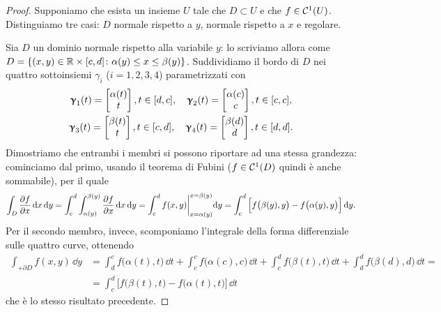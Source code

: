 \begin{proof}
	Supponiamo che esista un insieme $U$ tale che $D\subset U$ e che $f\in\mathcal{C}^{{1}}(U)$.
	Distinguiamo tre casi: $D$ normale rispetto a $y$, normale rispetto a $x$ e regolare.

	Sia $D$ un dominio normale rispetto alla variabile $y$: lo scriviamo allora come $D=\{(x,y)\in\mathbb{R}\times[c,d]\colon \alpha(y)\leq x\leq\beta(y)\}$.
	Suddividiamo il bordo di $D$ nei quattro sottoinsiemi $\gamma_i$ ($i=1,2,3,4$) parametrizzati con
	\begin{gather*}
		\bm{\upgamma}_1(t)=
		\begin{bmatrix}
			\alpha(t)\\t
		\end{bmatrix}, t\in[d,c],\quad
		\bm{\upgamma}_2(t)=
		\begin{bmatrix}
			\alpha(c)\\c
		\end{bmatrix}, t\in[c,c],\\
		\bm{\upgamma}_3(t)=
		\begin{bmatrix}
			\beta(t)\\t
		\end{bmatrix}, t\in[c,d],\quad 
		\bm{\upgamma}_4(t)=
		\begin{bmatrix}
			\beta(d)\\d
		\end{bmatrix}, t\in[d,d].
	\end{gather*}
	Dimostriamo che entrambi i membri si possono riportare ad una stessa grandezza: cominciamo dal primo, usando il teorema di Fubini ($f\in\mathcal{C}^{{1}}(D)$ quindi è anche sommabile), per il quale
	\begin{equation}
		\int_D\frac{\partial {f}}{\partial {x}}\,\textup{d} x\,\textup{d} y=\int_c^d\int_{\alpha(y)}^{\beta(y)}\frac{\partial {f}}{\partial {x}}\,\textup{d} x\,\textup{d} y=\int_c^df(x,y)\bigg|_{x=\alpha(y)}^{x=\beta(y)}\textup{d} y=\int_c^d\Big[f\big(\beta(y),y\big)-f\big(\alpha(y),y\big)\Big]\,\textup{d} y.
	\end{equation}
	Per il secondo membro, invece, scomponiamo l'integrale della forma differenziale sulle quattro curve, ottenendo
	\begin{equation}
		\begin{split}
			\int_{+\partial D}f(x,y)\,\dd y&=\int_d^cf\big(\alpha(t),t\big)\,\dd t+\int_c^cf\big(\alpha(c),c\big)\,\dd t+\int_c^df\big(\beta(t),t\big)\,\dd t+\int_d^df\big(\beta(d),d\big)\,\dd t=\\
			&=\int_c^d\Big[f\big(\beta(t),t\big)-f\big(\alpha(t),t\big)\Big]\,\dd t
		\end{split}
	\end{equation}
	che è lo stesso risultato precedente.


\end{proof}
